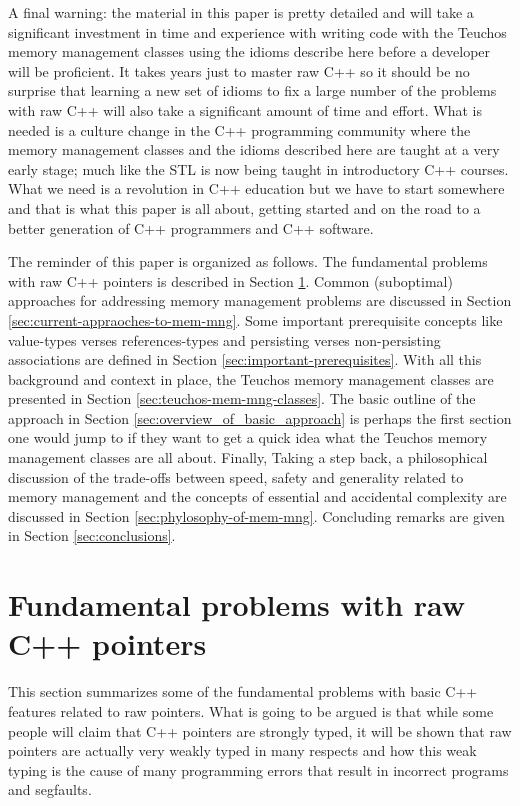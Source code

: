 \documentclass[pdf,ps2pdf,11pt]{SANDreport}
\begin{document}
A final warning: the material in this paper is pretty detailed and
will take a significant investment in time and experience with writing
code with the Teuchos memory management classes using the idioms
describe here before a developer will be proficient.  It takes years
just to master raw C++ so it should be no surprise that learning a new
set of idioms to fix a large number of the problems with raw C++ will
also take a significant amount of time and effort.  What is needed is
a culture change in the C++ programming community where the memory
management classes and the idioms described here are taught at a very
early stage; much like the STL is now being taught in introductory C++
courses.  What we need is a revolution in C++ education but we have to
start somewhere and that is what this paper is all about, getting
started and on the road to a better generation of C++ programmers and
C++ software.

The reminder of this paper is organized as follows. The fundamental
problems with raw C++ pointers is described in Section
{}\ref{sec:problems-with-raw-pointers}.  Common (suboptimal)
approaches for addressing memory management problems are discussed in
Section {}\ref{sec:current-appraoches-to-mem-mng}.  Some important
prerequisite concepts like value-types verses references-types and
persisting verses non-persisting associations are defined in Section
{}\ref{sec:important-prerequisites}.  With all this background and
context in place, the Teuchos memory management classes are presented
in Section {}\ref{sec:teuchos-mem-mng-classes}.  The basic outline of
the approach in Section {}\ref{sec:overview_of_basic_approach} is
perhaps the first section one would jump to if they want to get a
quick idea what the Teuchos memory management classes are all about.
Finally, Taking a step back, a philosophical discussion of the
trade-offs between speed, safety and generality related to memory
management and the concepts of essential and accidental complexity are
discussed in Section {}\ref{sec:phylosophy-of-mem-mng}.  Concluding
remarks are given in Section {}\ref{sec:conclusions}.


%
{}\section{Fundamental problems with raw C++ pointers}
\label{sec:problems-with-raw-pointers}
%

This section summarizes some of the fundamental problems with basic
C++ features related to raw pointers.  What is going to be argued is
that while some people will claim that C++ pointers are strongly
typed, it will be shown that raw pointers are actually very weakly
typed in many respects and how this weak typing is the cause of many
programming errors that result in incorrect programs and segfaults.
\end{document}
